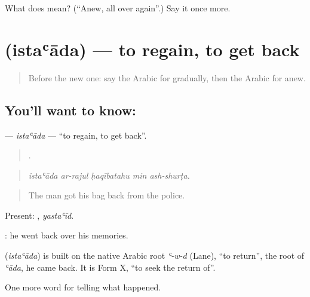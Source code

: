 \begin{tcolorbox}[breakable,colback=teal!4,colframe=teal!35!black,title={Before you move on}]
What does   mean? (\textquotedblleft{}Anew, all over again\textquotedblright{}.) Say it once more.
\end{tcolorbox}
\section[\texorpdfstring{\ar{استعاد} (istaʿāda)}{استعاد (istaʿāda)}]{ (istaʿāda) — to regain, to get back}

\label{lesson:AR-C313-istaada}



\begin{quote}
Before the new one: say the Arabic for gradually, then the Arabic for anew.
\end{quote}

\subsection*{You'll want to know: }
\textbf{} — \emph{istaʿāda} — \textquotedblleft{}to regain, to get back\textquotedblright{}.

\begin{quote}
    .
\end{quote}

\begin{quote}
\emph{istaʿāda ar-rajul ḥaqībatahu min ash-shurṭa.}
\end{quote}

\begin{quote}
The man got his bag back from the police.
\end{quote}

Present: , \emph{yastaʿīd}.

 : he went back over his memories.

\begin{cousinweb}
\textbf{} (\emph{istaʿāda}) is built on the native Arabic root \emph{ʿ-w-d} (Lane), \textquotedblleft{}to return\textquotedblright{}, the root of \emph{ʿāda}, he came back. It is Form X, \textquotedblleft{}to seek the return of\textquotedblright{}.
\end{cousinweb}

\begin{grammarlens}[title={What you've built}]
One more word for telling what happened.
\end{grammarlens}

